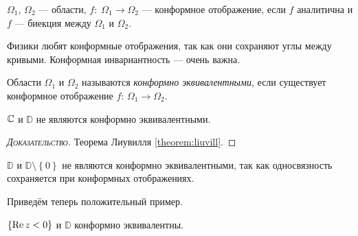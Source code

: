 \documentclass[../complex-analysis.tex]{subfiles}
\begin{document}
\begin{df}
 $ \Omega_1 $, $ \Omega_2 $ --- области, $ f \colon\; \Omega_1 \to \Omega_2 $ --- конформное отображение, если $ f $ аналитична и $ f $ --- биекция между $ \Omega_1 $ и $ \Omega_2 $.
\end{df}

Физики любят конформные отображения, так как они сохраняют углы между кривыми. Конформная инвариантность --- очень важна.

\begin{df}
 Области $ \Omega_1 $ и $ \Omega_2 $ называются \textit{конформно эквивалентными}, если существует конформное отображение $ f \colon\, \Omega_1 \to \Omega_2 $.
\end{df}

\begin{exmpl}
 $ \mathbb{C} $ и $ \mathbb D $ не являются конформно эквивалентными.
\end{exmpl}
\begin{proof}[\normalfont\textsc{Доказательство}]
  Теорема Лиувилля \eqref{theorem:liuvill}.
\end{proof}
\begin{exmpl}
 $ \mathbb D $ и $ \mathbb D \setminus \left\{ 0 \right\} $ не являются конформно эквивалентными, так как односвязность сохраняется при конформных отображениях.
\end{exmpl}
Приведём теперь положительный пример.
\begin{exmpl}
 $ \left\{ \operatorname{Re} z < 0 \right\} $ и $ \mathbb D $ конформно эквивалентны.
\end{exmpl}
\end{document}

